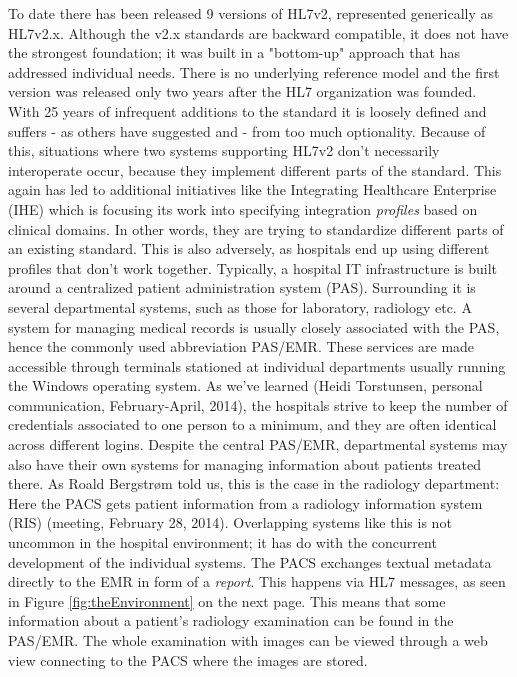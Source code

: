 To date there has been released 9 versions of HL7v2, represented generically as HL7v2.x. Although the v2.x standards are backward compatible, it does not have the strongest foundation; it was built in a "bottom-up" approach that has addressed individual needs. There is no underlying reference model and the first version was released only two years after the HL7 organization was founded. With 25 years of infrequent additions to the standard it is loosely defined and suffers - as others have suggested \cite{evolution:hl7} and \cite{rel:openehr} - from too much optionality. Because of this, situations where two systems supporting HL7v2 don't necessarily interoperate occur, because they implement different parts of the standard. This again has led to additional initiatives like the Integrating Healthcare Enterprise (IHE) \cite{ihe} which is focusing its work into specifying integration \emph{profiles} based on clinical domains. In other words, they are trying to standardize different parts of an existing standard. This is also adversely, as hospitals end up using different profiles that don't work together.
Typically, a hospital IT infrastructure is built around a centralized patient administration system (PAS). Surrounding it is several departmental systems, such as those for laboratory, radiology etc. A system for managing medical records is usually closely associated with the PAS, hence the commonly used abbreviation PAS/EMR. These services are made accessible through terminals stationed at individual departments usually running the Windows operating system. As we've learned (Heidi Torstunsen, personal communication, February-April, 2014), the hospitals strive to keep the number of credentials associated to one person to a minimum, and they are often identical across different logins. Despite the central PAS/EMR, departmental systems may also have their own systems for managing information about patients treated there. As Roald Bergstrøm told us, this is the case in the radiology department: Here the PACS gets patient information from a radiology information system (RIS) (meeting, February 28, 2014). Overlapping systems like this is not uncommon in the hospital environment; it has do with the concurrent development of the individual systems. The PACS exchanges textual metadata directly to the EMR in form of a \emph{report}. This happens via HL7 messages, as seen in Figure \ref{fig:theEnvironment} on the next page. This means that some information about a patient's radiology examination can be found in the PAS/EMR. The whole examination with images can be viewed through a web view connecting to the PACS where the images are stored.


